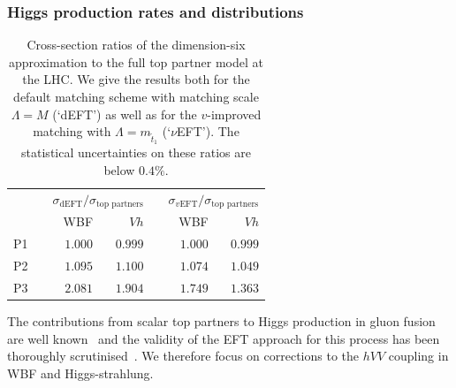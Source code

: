 


\subsubsection{Higgs production rates and distributions}

\begin{table}[t]
    \begin{tabular}{c c rr c rr}
      \toprule
      \multirow{2}{*}{}
      && \multicolumn{2}{c}{$\sigma_\text{dEFT} / \sigma_\text{top partners}$}
      && \multicolumn{2}{c}{$\sigma_\text{$v$EFT} / \sigma_\text{top partners}$} \\
      \cmidrule{3-4}\cmidrule{6-7}
      && WBF & $Vh$
      && WBF & $Vh$ \\
      \midrule
      P1 && $1.000$ & $0.999$ && $1.000$ & $0.999$ \\
      P2 && $1.095$ & $1.100$ && $1.074$ & $1.049$ \\
      P3 && $2.081$ & $1.904$ && $1.749$ & $1.363$ \\
      \bottomrule
    \end{tabular}
    \caption[Total Higgs production cross sections in the top partner model]{Cross-section
      ratios of the dimension-six approximation to the full
      top partner model at the LHC. We
      give the results both for the default matching scheme with matching
      scale $\Lambda = M$ (`dEFT') as well as for the $v$-improved matching with
      $\Lambda = m_{\tilde{t}_{1}}$ (`$\nu$EFT'). The statistical uncertainties on these
      ratios are below $0.4\%$.}
  \label{tbl:validity_partners_rates}
\end{table}

The contributions from scalar top partners to Higgs production in
gluon fusion are well known~\cite{Berger:2012ec, Dawson:2012di,
  Fajfer:2013wca, Ellis:2014dza, Chen:2014xwa} and the validity of the
EFT approach for this process has been thoroughly
scrutinised~\cite{Dawson:2015gka, Drozd:2015kva}. We therefore focus
on corrections to the $hVV$ coupling in WBF and Higgs-strahlung.

